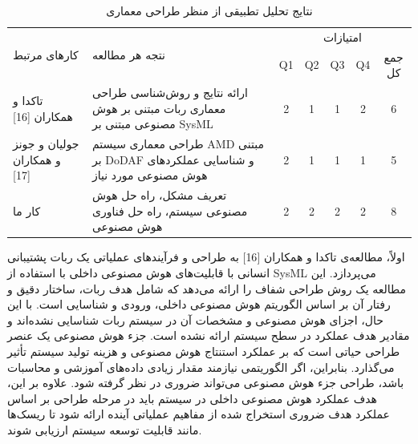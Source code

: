 \documentclass[a4paper,10pt]{article}
\begin{document}
                    \begin{table}
                        
                        \centering
                        \caption{نتایج تحلیل تطبیقی از منظر طراحی معماری}
                        \begin{tabularx}{\textwidth}{ p{4cm} p{9.3cm} c c c c c }

                            \hline
                            
                            \multirow{2}{*}{کارهای مرتبط} & \multirow{2}{*}{نتجه هر مطالعه} & \multicolumn{5}{c}{امتیازات} \\
                            &  & Q1 & Q2 & Q3 & Q4 & جمع کل \\
                            
                            \hline

                            تاکدا و همکاران [16] & ارائه نتایج و روش‌شناسی طراحی معماری ربات مبتنی بر هوش مصنوعی مبتنی بر SysML & 2 & 1 & 1 & 2 & 6 \\

                            جولیان و جونز و همکاران [17] & طراحی معماری سیستم AMD مبتنی بر DoDAF و شناسایی عملکردهای هوش مصنوعی مورد نیاز & 2 & 1 & 1 & 1 & 5 \\

                            کار ما & تعریف مشکل، راه حل هوش مصنوعی سیستم، راه حل فناوری هوش مصنوعی & 2 & 2 & 2 & 2 & 8 \\

                            \hline

                        \end{tabularx}

                    \end{table}

                    اولاً، مطالعه‌ی تاکدا و همکاران [16] به طراحی و فرآیندهای عملیاتی یک ربات پشتیبانی انسانی با قابلیت‌های هوش مصنوعی داخلی با استفاده از SysML می‌پردازد. این مطالعه یک روش طراحی شفاف را ارائه می‌دهد که شامل هدف ربات، ساختار دقیق و رفتار آن بر اساس الگوریتم هوش مصنوعی داخلی، ورودی و شناسایی است. با این حال، اجزای هوش مصنوعی و مشخصات آن در سیستم ربات شناسایی نشده‌اند و مقادیر هدف عملکرد در سطح سیستم ارائه نشده است. جزء هوش مصنوعی یک عنصر طراحی حیاتی است که بر عملکرد استنتاج هوش مصنوعی و هزینه تولید سیستم تأثیر می‌گذارد. بنابراین، اگر الگوریتمی نیازمند مقدار زیادی داده‌های آموزشی و محاسبات باشد، طراحی جزء هوش مصنوعی می‌تواند ضروری در نظر گرفته شود. علاوه بر این، هدف عملکرد هوش مصنوعی داخلی در سیستم باید در مرحله طراحی بر اساس عملکرد هدف ضروری استخراج شده از مفاهیم عملیاتی آینده ارائه شود تا ریسک‌ها مانند قابلیت توسعه سیستم ارزیابی شوند.
\end{document}
